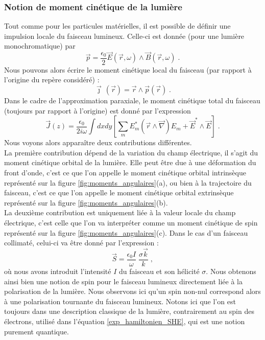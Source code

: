 \documentclass[a4paper,11pt]{article} %
\begin{document}
	\subsubsection{Notion de moment cinétique de la lumière}
	Tout comme pour les particules matérielles, il est possible de définir une impulsion locale du faisceau lumineux. Celle-ci est donnée (pour une lumière monochromatique) par 
	\begin{equation*}
		\vec{p} = \frac{\epsilon_0}{2} \vec{E}(\vec{r}, \omega) \wedge \vec{B}(\vec{r}, \omega) \; .
	\end{equation*}
	Nous pouvons alors écrire le moment cinétique local du faisceau (par rapport à l'origine du repère considéré) :
	\begin{equation*}
		\vec{\jmath} \, (\vec{r}) = \vec{r} \wedge \vec{p}(\vec{r}) \; .
	\end{equation*}	
	Dans le cadre de l'approximation paraxiale, le moment cinétique total du faisceau (toujours par rapport à l'origine) est donné par l'expression
	\begin{equation}
		\label{def_J(z)}
		\vec{J}(z) = \frac{\epsilon_0}{2 i \omega} \int dx dy \left[ \sum_m E_m^* (\vec{r} \wedge \vec{\nabla}) E_m + \vec{E}^* \wedge \vec{E} \right] \; .
	\end{equation}
	Nous voyons alors apparaître deux contributions différentes.\\
	
	La première contribution dépend de la variation du champ électrique, il s'agit du moment cinétique orbital de la lumière. Elle peut être due à une déformation du front d'onde, c'est ce que l'on appelle le moment cinétique orbital intrinsèque représenté sur la figure \ref{fig:moments_angulaires}(a), ou bien à la trajectoire du faisceau, c'est ce que l'on appelle le moment cinétique orbital extrinsèque représenté sur la figure \ref{fig:moments_angulaires}(b).\\	
	
	La deuxième contribution est uniquement liée à la valeur locale du champ électrique, c'est celle que l'on va interpréter comme un moment cinétique de spin représenté sur la figure \ref{fig:moments_angulaires}(c). Dans le cas d'un faisceau collimaté, celui-ci va être donné par l'expression :
		\begin{equation*}
			\vec{S} = \frac{\epsilon_0 I}{\omega} \; \frac{\sigma \vec{k}}{k} \; ,
		\end{equation*}
	où nous avons introduit l'intensité $ I $ du faisceau et son hélicité $ \sigma $. Nous obtenons ainsi bien une notion de spin pour le faisceau lumineux directement liée à la polarisation de la lumière. Nous observons ici qu'un spin non-nul correspond alors à une polarisation tournante du faisceau lumineux. Notons ici que l'on est toujours dans une description classique de la lumière, contrairement au spin des électrons, utilisé dans l'équation \eqref{exp_hamiltonien_SHE}, qui est une notion purement quantique.	
	
\end{document}
